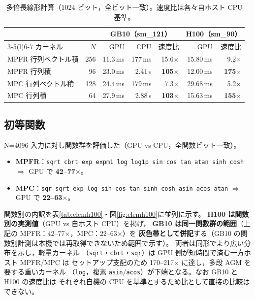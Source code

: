 \documentclass[uplatex,dvipdfmx,a4paper,11pt]{jsarticle}
\newcommand{\code}[1]{\texttt{#1}}
\begin{document}
\begin{table}[h]
\centering
\caption{多倍長線形計算（1024 ビット，全ビット一致）。速度比は各々自ホスト CPU 基準。}
\label{tab:linalg}
\begin{tabular}{lrrrr@{\hskip 2em}rr}
\toprule
 & & \multicolumn{3}{c}{GB10（sm\_121）} & \multicolumn{2}{c}{H100（sm\_90）}\\
\cmidrule(r){3-5}\cmidrule(l){6-7}
カーネル & $N$ & GPU & CPU & 速度比 & GPU & 速度比 \\
\midrule
MPFR 行列ベクトル積 & 256 & 11.3\,ms & 177\,ms  & 15.6$\times$           & 15.80\,ms & 9.2$\times$ \\
MPFR 行列積        & 96  & 23.0\,ms & 2.41\,s  & \textbf{105$\times$}  & 12.00\,ms & \textbf{175$\times$} \\
MPC  行列ベクトル積 & 128 & 24.4\,ms & 179\,ms  & 7.3$\times$           & 29.68\,ms & 5.2$\times$ \\
MPC  行列積        & 64  & 27.9\,ms & 2.88\,s  & \textbf{103$\times$}  & 15.63\,ms & \textbf{155$\times$} \\
\bottomrule
\end{tabular}
\end{table}

\subsection{初等関数}

N=4096 入力に対し関数群を評価した（GPU vs CPU，全関数ビット一致）。
\begin{itemize}
\item \textbf{MPFR}：\code{sqrt cbrt exp expm1 log log1p sin cos tan atan sinh cosh}
      $\Rightarrow$ GPU で \textbf{42--77$\times$}。
\item \textbf{MPC}：\code{sqr sqrt exp log sin cos tan sinh cosh asin acos atan}
      $\Rightarrow$ GPU で \textbf{22--63$\times$}。
\end{itemize}

関数別の内訳を表\ref{tab:elemh100}・図\ref{fig:elemh100}に並列に示す。
\textbf{H100 は関数別の実測値}（GPU vs 自ホスト CPU）を掲げ，
\textbf{GB10 は同一関数群の範囲}（上記の MPFR：42--77$\times$，MPC：22--63$\times$）を
\textbf{灰色帯として併記}する（GB10 の関数別計測は本機では再取得できないため範囲で示す）。
両者は同形でより広い分布を示し，軽量カーネル
（\code{sqrt}・\code{cbrt}・\code{sqr}）は GPU 側が短時間で済む一方ホスト MPFR/MPC は
セットアップ支配のため 170--217$\times$ に達し，多段 AGM を要する重いカーネル
（\code{log}，複素 \code{asin}/\code{acos}）が下端となる。なお GB10 と H100 の速度比は
それぞれ自機の CPU を基準とするため比として直接の比較はできない。
\end{document}
